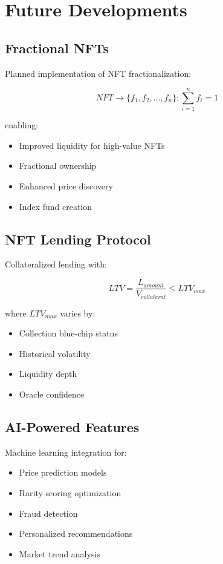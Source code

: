 \section{Future Developments}


\subsection{Fractional NFTs}

Planned implementation of NFT fractionalization:

\begin{equation}
NFT \rightarrow \{f_1, f_2, ..., f_n\} : \sum_{i=1}^{n} f_i = 1
\end{equation}

enabling:
\begin{itemize}
\item Improved liquidity for high-value NFTs
\item Fractional ownership
\item Enhanced price discovery
\item Index fund creation
\end{itemize}

\subsection{NFT Lending Protocol}

Collateralized lending with:

\begin{equation}
LTV = \frac{L_{amount}}{V_{collateral}} \leq LTV_{max}
\end{equation}

where $LTV_{max}$ varies by:
\begin{itemize}
\item Collection blue-chip status
\item Historical volatility
\item Liquidity depth
\item Oracle confidence
\end{itemize}

\subsection{AI-Powered Features}

Machine learning integration for:

\begin{itemize}
\item Price prediction models
\item Rarity scoring optimization
\item Fraud detection
\item Personalized recommendations
\item Market trend analysis
\end{itemize}

